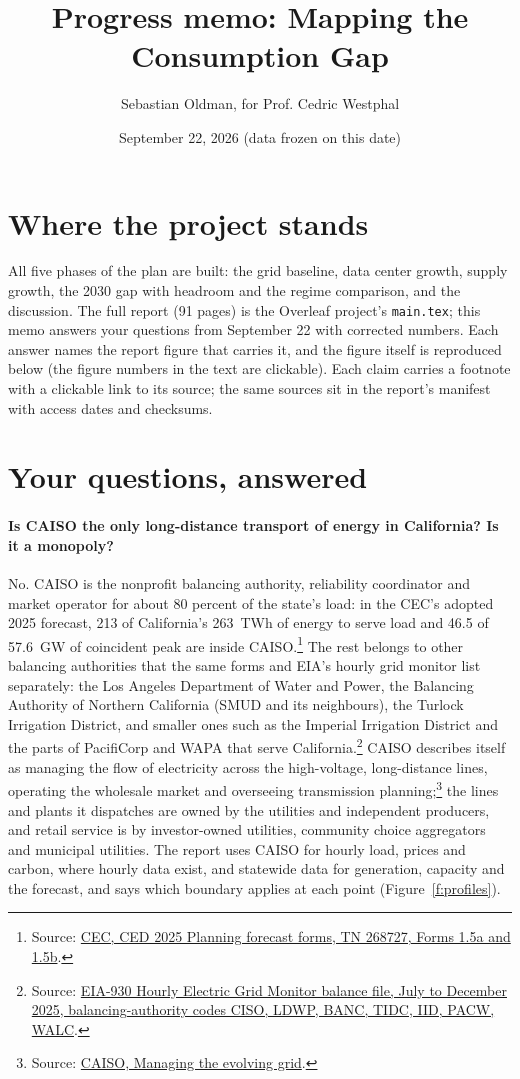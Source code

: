 \documentclass[11pt]{article}
\title{Progress memo: Mapping the Consumption Gap}
\author{Sebastian Oldman, for Prof. Cedric Westphal}
\date{September 22, 2026 (data frozen on this date)}
\newcommand{\src}[2]{\footnote{Source: \href{#1}{#2}.}}
\begin{document}
\maketitle

\section*{Where the project stands}
All five phases of the plan are built: the grid baseline, data center growth, supply growth, the 2030 gap with headroom and the regime comparison, and the discussion. The full report (91 pages) is the Overleaf project's \texttt{main.tex}; this memo answers your questions from September 22 with corrected numbers. Each answer names the report figure that carries it, and the figure itself is reproduced below (the figure numbers in the text are clickable). Each claim carries a footnote with a clickable link to its source; the same sources sit in the report's manifest with access dates and checksums.

\section*{Your questions, answered}

\paragraph{Is CAISO the only long-distance transport of energy in California? Is it a monopoly?}
No. CAISO is the nonprofit balancing authority, reliability coordinator and market operator for about 80 percent of the state's load: in the CEC's adopted 2025 forecast, 213 of California's 263~TWh of energy to serve load and 46.5 of 57.6~GW of coincident peak are inside CAISO.\src{https://efiling.energy.ca.gov/GetDocument.aspx?tn=268727}{CEC, CED 2025 Planning forecast forms, TN 268727, Forms 1.5a and 1.5b} The rest belongs to other balancing authorities that the same forms and EIA's hourly grid monitor list separately: the Los Angeles Department of Water and Power, the Balancing Authority of Northern California (SMUD and its neighbours), the Turlock Irrigation District, and smaller ones such as the Imperial Irrigation District and the parts of PacifiCorp and WAPA that serve California.\src{https://www.eia.gov/electricity/gridmonitor/sixMonthFiles/EIA930_BALANCE_2025_Jul_Dec.csv}{EIA-930 Hourly Electric Grid Monitor balance file, July to December 2025, balancing-authority codes CISO, LDWP, BANC, TIDC, IID, PACW, WALC} CAISO describes itself as managing the flow of electricity across the high-voltage, long-distance lines, operating the wholesale market and overseeing transmission planning;\src{https://www.caiso.com/about/our-business/managing-the-evolving-grid}{CAISO, Managing the evolving grid} the lines and plants it dispatches are owned by the utilities and independent producers, and retail service is by investor-owned utilities, community choice aggregators and municipal utilities. The report uses CAISO for hourly load, prices and carbon, where hourly data exist, and statewide data for generation, capacity and the forecast, and says which boundary applies at each point (Figure~\ref{f:profiles}).
\end{document}
